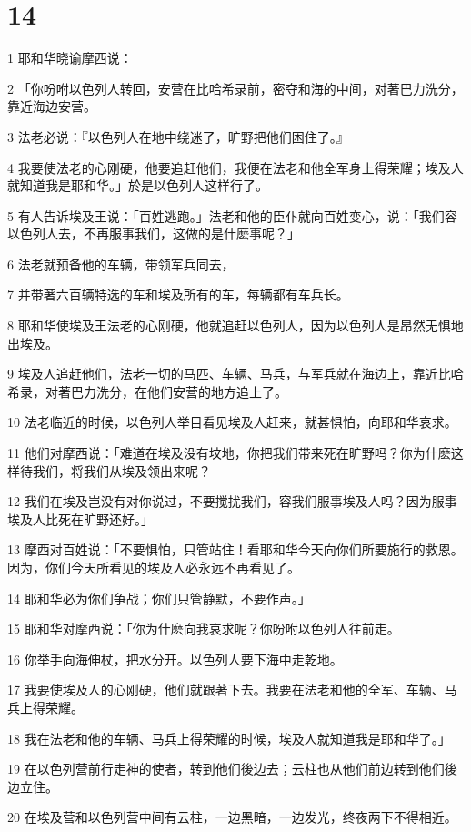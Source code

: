 \chapter{14}

\par 1 耶和华晓谕摩西说：
\par 2 「你吩咐以色列人转回，安营在比哈希录前，密夺和海的中间，对著巴力洗分，靠近海边安营。
\par 3 法老必说：『以色列人在地中绕迷了，旷野把他们困住了。』
\par 4 我要使法老的心刚硬，他要追赶他们，我便在法老和他全军身上得荣耀；埃及人就知道我是耶和华。」於是以色列人这样行了。
\par 5 有人告诉埃及王说：「百姓逃跑。」法老和他的臣仆就向百姓变心，说：「我们容以色列人去，不再服事我们，这做的是什麽事呢？」
\par 6 法老就预备他的车辆，带领军兵同去，
\par 7 并带著六百辆特选的车和埃及所有的车，每辆都有车兵长。
\par 8 耶和华使埃及王法老的心刚硬，他就追赶以色列人，因为以色列人是昂然无惧地出埃及。
\par 9 埃及人追赶他们，法老一切的马匹、车辆、马兵，与军兵就在海边上，靠近比哈希录，对著巴力洗分，在他们安营的地方追上了。
\par 10 法老临近的时候，以色列人举目看见埃及人赶来，就甚惧怕，向耶和华哀求。
\par 11 他们对摩西说：「难道在埃及没有坟地，你把我们带来死在旷野吗？你为什麽这样待我们，将我们从埃及领出来呢？
\par 12 我们在埃及岂没有对你说过，不要搅扰我们，容我们服事埃及人吗？因为服事埃及人比死在旷野还好。」
\par 13 摩西对百姓说：「不要惧怕，只管站住！看耶和华今天向你们所要施行的救恩。因为，你们今天所看见的埃及人必永远不再看见了。
\par 14 耶和华必为你们争战；你们只管静默，不要作声。」
\par 15 耶和华对摩西说：「你为什麽向我哀求呢？你吩咐以色列人往前走。
\par 16 你举手向海伸杖，把水分开。以色列人要下海中走乾地。
\par 17 我要使埃及人的心刚硬，他们就跟著下去。我要在法老和他的全军、车辆、马兵上得荣耀。
\par 18 我在法老和他的车辆、马兵上得荣耀的时候，埃及人就知道我是耶和华了。」
\par 19 在以色列营前行走神的使者，转到他们後边去；云柱也从他们前边转到他们後边立住。
\par 20 在埃及营和以色列营中间有云柱，一边黑暗，一边发光，终夜两下不得相近。
